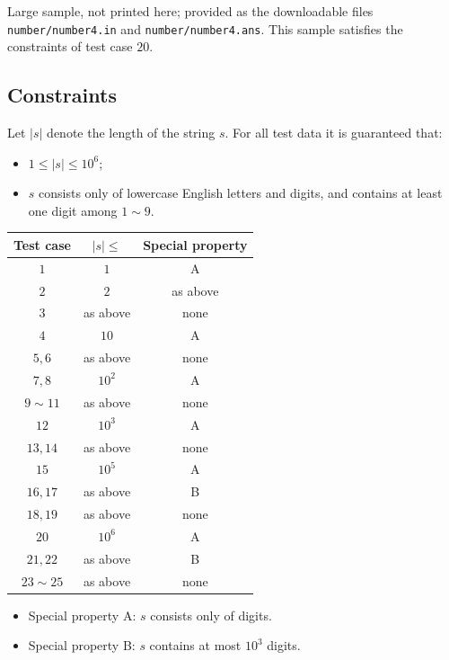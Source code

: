 \documentclass[11pt]{article}
\begin{document}
Large sample, not printed here;
provided as the downloadable files \texttt{number/number4.in} and \texttt{number/number4.ans}.
This sample satisfies the constraints of test case $20$.

\subsection*{Constraints}

Let $|s|$ denote the length of the string $s$.
For all test data it is guaranteed that:
\begin{itemize}
\item $1 \leq |s| \leq 10^6$;
\item $s$ consists only of lowercase English letters and digits,
and contains at least one digit among $1 \sim 9$.
\end{itemize}

\begin{center}
\begin{tabular}{ccc}
\toprule
Test case & $|s| \leq$ & Special property \\
\midrule
$1$ & $1$ & A \\
$2$ & $2$ & as above \\
$3$ & as above & none \\
$4$ & $10$ & A \\
$5, 6$ & as above & none \\
$7, 8$ & $10^2$ & A \\
$9 \sim 11$ & as above & none \\
$12$ & $10^3$ & A \\
$13, 14$ & as above & none \\
$15$ & $10^5$ & A \\
$16, 17$ & as above & B \\
$18, 19$ & as above & none \\
$20$ & $10^6$ & A \\
$21, 22$ & as above & B \\
$23 \sim 25$ & as above & none \\
\bottomrule
\end{tabular}
\end{center}

\begin{itemize}
\item Special property A: $s$ consists only of digits.
\item Special property B: $s$ contains at most $10^3$ digits.
\end{itemize}
\end{document}
